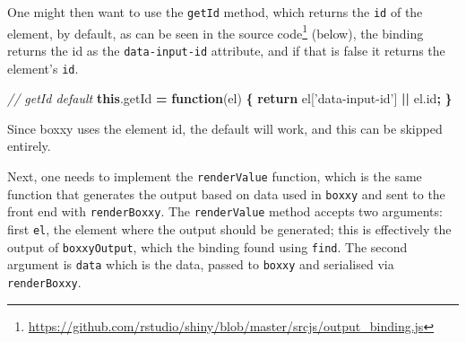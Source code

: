 \documentclass[10pt,]{krantz}
\makeatletter
\newenvironment{Shaded}{\begin{snugshade}}{\end{snugshade}}
\newcommand{\AttributeTok}[1]{\textcolor[rgb]{0.61,0.61,0.61}{#1}}
\newcommand{\CommentTok}[1]{\textcolor[rgb]{0.37,0.37,0.37}{\textit{#1}}}
\newcommand{\ControlFlowTok}[1]{\textcolor[rgb]{0.27,0.27,0.27}{\textbf{#1}}}
\newcommand{\DataTypeTok}[1]{\textcolor[rgb]{0.27,0.27,0.27}{#1}}
\newcommand{\KeywordTok}[1]{\textcolor[rgb]{0.27,0.27,0.27}{\textbf{#1}}}
\newcommand{\NormalTok}[1]{#1}
\newcommand{\OperatorTok}[1]{\textcolor[rgb]{0.43,0.43,0.43}{\textbf{#1}}}
\newcommand{\StringTok}[1]{\textcolor[rgb]{0.5,0.5,0.5}{#1}}
\newcommand{\VariableTok}[1]{\textcolor[rgb]{0,0,0}{#1}}
\renewcommand{\href}[2]{#2\footnote{\url{#1}}}
\newenvironment{kframe}{%
\medskip{}
\setlength{\fboxsep}{.8em}
 \def\at@end@of@kframe{}%
 \ifinner\ifhmode%
  \def\at@end@of@kframe{\end{minipage}}%
  \begin{minipage}{\columnwidth}%
 \fi\fi%
 \def\FrameCommand##1{\hskip\@totalleftmargin \hskip-\fboxsep
 \colorbox{shadecolor}{##1}\hskip-\fboxsep
     \hskip-\linewidth \hskip-\@totalleftmargin \hskip\columnwidth}%
 \MakeFramed {\advance\hsize-\width
   \@totalleftmargin\z@ \linewidth\hsize
   \@setminipage}}%
 {\par\unskip\endMakeFramed%
 \at@end@of@kframe}
\renewenvironment{Shaded}{\begin{kframe}}{\end{kframe}}
\makeatother
\begin{document}
\begin{Shaded}
\end{Shaded}

One might then want to use the \texttt{getId} method, which returns the \texttt{id} of the element, by default, as can be seen in the \href{https://github.com/rstudio/shiny/blob/master/srcjs/output_binding.js}{source code} (below), the binding returns the id as the \texttt{data-input-id} attribute, and if that is false it returns the element's \texttt{id}.

\begin{Shaded}
\begin{Highlighting}[]
\CommentTok{// getId default}
\KeywordTok{this}\NormalTok{.}\AttributeTok{getId} \OperatorTok{=} \KeywordTok{function}\NormalTok{(el) }\OperatorTok{\{}
  \ControlFlowTok{return}\NormalTok{ el[}\StringTok{'data-input-id'}\NormalTok{] }\OperatorTok{||} \VariableTok{el}\NormalTok{.}\AttributeTok{id}\OperatorTok{;}
\OperatorTok{\}}
\end{Highlighting}
\end{Shaded}

Since boxxy uses the element id, the default will work, and this can be skipped entirely.

Next, one needs to implement the \texttt{renderValue} function, which is the same function that generates the output based on data used in \texttt{boxxy} and sent to the front end with \texttt{renderBoxxy}. The \texttt{renderValue} method accepts two arguments: first \texttt{el}, the element where the output should be generated; this is effectively the output of \texttt{boxxyOutput}, which the binding found using \texttt{find}. The second argument is \texttt{data} which is the data, passed to \texttt{boxxy} and serialised via \texttt{renderBoxxy}.
\end{document}
